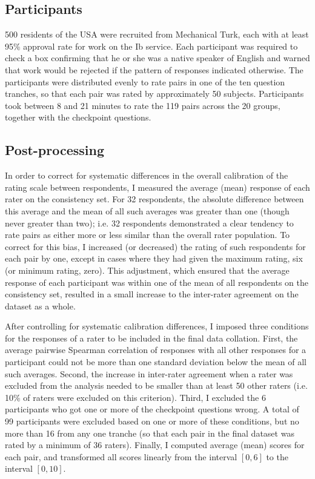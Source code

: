 \subsection{Participants}

500 residents of the USA were recruited from Mechanical Turk, each with at least 95\% approval rate for work on the Ib service. Each participant was required to check a box confirming that he or she was a native speaker of English and warned that work would be rejected if the pattern of responses indicated otherwise. The participants were distributed evenly to rate pairs in one of the ten question tranches, so that each pair was rated by approximately 50 subjects. Participants took between 8 and 21 minutes to rate the 119 pairs across the 20 groups, together with the checkpoint questions. 

\subsection{Post-processing}

In order to correct for systematic differences in the overall calibration of the rating scale between respondents, I measured the average (mean) response of each rater on the consistency set. For 32 respondents, the absolute difference between this average and the mean of all such averages was greater than one (though never greater than two); i.e. 32 respondents demonstrated a clear tendency to rate pairs as either more or less similar than the overall rater population. To correct for this bias, I increased (or decreased) the rating of such respondents for each pair by one, except in cases where they had given the maximum rating, six (or minimum rating, zero). This adjustment, which ensured that the average response of each participant was within one of the mean of all respondents on the consistency set, resulted in a small increase to the inter-rater agreement on the dataset as a whole.     

After controlling for systematic calibration differences, I imposed three conditions for the responses of a rater to be included in the final data collation.  First, the average pairwise Spearman correlation of responses with all other responses for a participant could not be more than one standard deviation below the mean of all such averages. Second, the increase in inter-rater agreement when a rater was excluded from the analysis needed to be smaller than at least 50 other raters (i.e. 10\% of raters were excluded on this criterion). Third, I excluded the 6 participants who got one or more of the checkpoint questions wrong. A total of 99 participants were excluded based on one or more of these conditions, but no more than 16 from any one tranche (so that each pair in the final dataset was rated by a minimum of 36 raters). Finally, I computed average (mean) scores for each pair, and transformed all scores linearly from the interval \([0,6]\) to the interval \([0,10]\).

